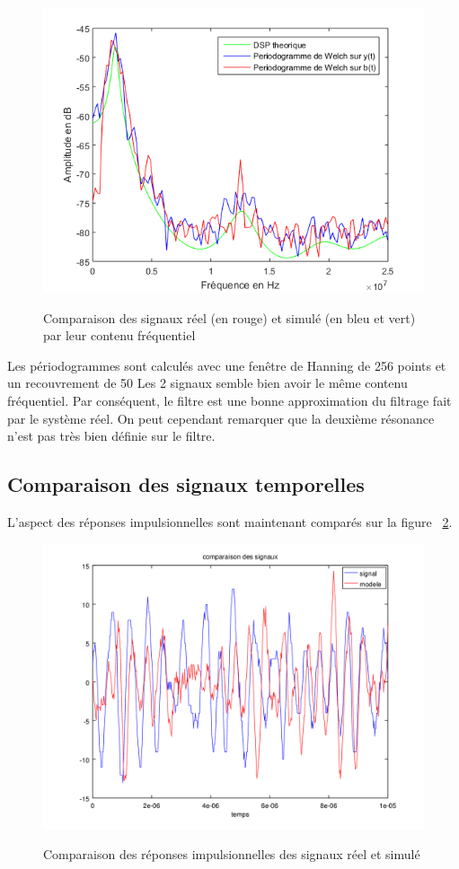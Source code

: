 \documentclass[a4paper]{article}
\begin{document}
\begin{figure}[!h]
	\centering
	\includegraphics[scale=0.7]{dsp1.png}
    \label{dsp}
    \caption{Comparaison des signaux réel (en rouge) et simulé (en bleu et vert) par leur contenu fréquentiel}
\end{figure}
Les périodogrammes sont calculés avec une fenêtre de Hanning de 256 points et un recouvrement de 50%
Les 2 signaux semble bien avoir le même contenu fréquentiel. Par conséquent, le filtre est une bonne approximation du filtrage fait par le système réel.
On peut cependant remarquer que la deuxième résonance n'est pas très bien définie sur le filtre.

\subsection{Comparaison des signaux temporelles}
L'aspect des réponses impulsionnelles sont maintenant comparés sur la figure ~\ref{comp_temps}.

\begin{figure}[!h]
	\centering
	\includegraphics[scale=0.5]{comp_temps.png}
    \label{comp_temps}
    \caption{Comparaison des réponses impulsionnelles des signaux réel et simulé }
\end{figure}
\end{document}
